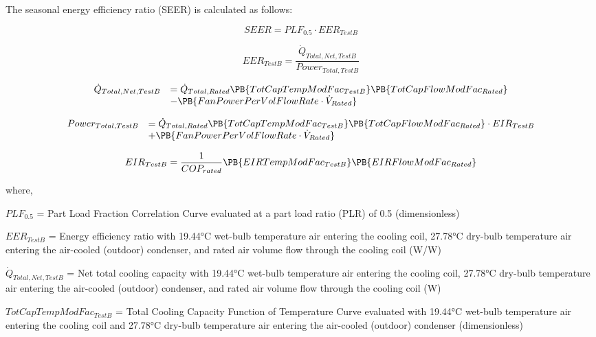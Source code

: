 The seasonal energy efficiency ratio (SEER) is calculated as follows:

\begin{equation}
SEER = PL{F_{0.5}} \cdot EE{R_{TestB}}
\end{equation}

\begin{equation}
EE{R_{TestB}} = \frac{{{{\dot Q}_{Total,Net,TestB}}}}{{Powe{r_{Total,TestB}}}}
\end{equation}

\begin{equation}
  \begin{array}{rl}
    \dot{Q}_{Total,Net,TestB} &= \dot{Q}_{Total,Rated} \PB{TotCapTempModFac_{TestB}}\PB{TotCapFlowModFac_{Rated}} \\
                              &- \PB{FanPowerPerVolFlowRate \cdot \dot{V}_{Rated}}
  \end{array}
\end{equation}

\begin{equation}
  \begin{array}{rl}
    Power_{Total,TestB} &= \dot{Q}_{Total,Rated} \PB{TotCapTempModFac_{TestB}}\PB{TotCapFlowModFac_{Rated}}\cdot EIR_{TestB} \\
                        &+ \PB{FanPowerPerVolFlowRate \cdot \dot{V}_{Rated}}
  \end{array}
\end{equation}

\begin{equation}
  EIR_{TestB} = \frac{1}{COP_{rated}}\PB{EIRTempModFac_{TestB}}\PB{EIRFlowModFac_{Rated}}
\end{equation}

where,

\(PLF_{0.5}\) = Part Load Fraction Correlation Curve evaluated at a part load ratio (PLR) of 0.5 (dimensionless)

\(EER_{TestB}\) = Energy efficiency ratio with 19.44°C wet-bulb temperature air entering the cooling coil, 27.78°C dry-bulb temperature air entering the air-cooled (outdoor) condenser, and rated air volume flow through the cooling coil (W/W)

\({\dot Q_{Total,Net,TestB}}\) = Net total cooling capacity with 19.44°C wet-bulb temperature air entering the cooling coil, 27.78°C dry-bulb temperature air entering the air-cooled (outdoor) condenser, and rated air volume flow through the cooling coil (W)

\(TotCapTempModFa{c_{TestB}}\) = Total Cooling Capacity Function of Temperature Curve evaluated with 19.44°C wet-bulb temperature air entering the cooling coil and 27.78°C dry-bulb temperature air entering the air-cooled (outdoor) condenser (dimensionless)

